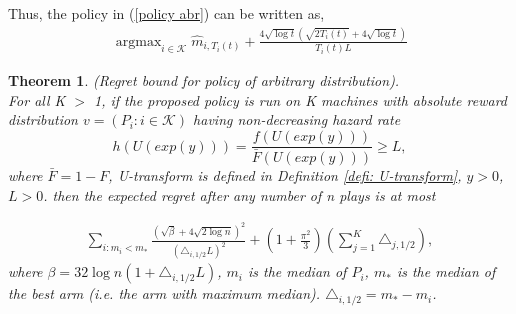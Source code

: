 \documentclass{article}
\DeclareMathOperator*{\argmax}{argmax}
\theoremstyle{plain}
\newtheorem{theo}{Theorem}
\begin{document}
Thus, the policy in (\ref{policy abr}) can be written as,
\begin{align}
    \argmax_{i \in \mathcal{K}} \hat{m}_{i, T_i(t)} +  \frac{4 \sqrt{\log t} ( \sqrt{ 2T_i(t)} + 4\sqrt{\log t})}{T_i(t) L}
\end{align}

\begin{theo}
(Regret bound for policy of arbitrary distribution). \\

For all K $>$ 1, if the proposed policy is run on K machines with absolute reward distribution $v = (P_i: i \in \mathcal{K})$ having non-decreasing hazard rate $$h\left(U(exp(y))\right) = \frac{f\left(U(exp(y))\right)}{\bar{F}\left(U(exp(y))\right) } \geq L,$$
where $\bar{F} = 1 - F$, U-transform is defined in Definition \ref{defi: U-transform}, $y > 0$, $L > 0$.  then the expected regret after any number of n plays is at most 

\begin{align}
    \sum_{i: m_i < m_\ast} \frac{(\sqrt{\beta} + 4\sqrt{2\log n})^2}{ (\triangle_{i, 1/2} L)^2} + (1 + \frac{\pi^2}{3}) (\sum_{j=1}^K \triangle_{j, 1/2}),
\end{align}
where $\beta = 32 \log n (1 + \triangle_{i, 1/2} L)$, $m_i$ is the median of $P_i$, $m_\ast$ is the median of the best arm (i.e. the arm with maximum median). $\triangle_{i, 1/2} = m_\ast - m_i$. 
\end{theo}
\end{document}
